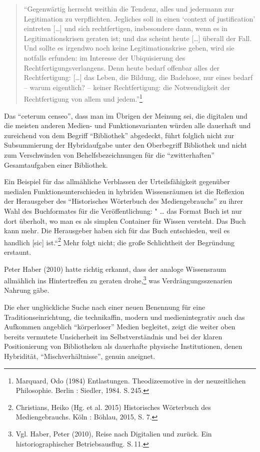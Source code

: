 \documentclass[a4paper,
fontsize=11pt,
oneside,
numbers=noperiodatend,
parskip=half-,
bibliography=totoc,
final
]{scrartcl}
\begin{document}
\begin{quote}
\enquote{Gegenwärtig herrscht weithin die Tendenz, alles und jedermann
zur Legitimation zu verpflichten. Jegliches soll in einen
\enquote{context of justification} eintreten {[}\ldots{}{]} und sich
rechtfertigen, insbesondere dann, wenn es in Legitimationskrisen geraten
ist; und das scheint heute {[}\ldots{}{]} überall der Fall. Und sollte
es irgendwo noch keine Legitimationskrise geben, wird sie notfalls
erfunden: im Interesse der Ubiquisierung des Rechtfertigungsverlangens.
Denn heute bedarf offenbar alles der Rechtfertigung: {[}\ldots{}{]} das
Leben, die Bildung, die Badehose, nur eines bedarf -- warum eigentlich?
-- keiner Rechtfertigung: die Notwendigkeit der Rechtfertigung von allem
und jedem.}\footnote{Marquard, Odo (1984) Entlastungen. Theodizeemotive
  in der neuzeitlichen Philosophie. Berlin : Siedler, 1984. S.\,245.}
\end{quote}

Das \enquote{ceterum censeo}, dass man im Übrigen der Meinung sei, die
digitalen und die meisten anderen Medien- und Funktionsvarianten würden
alle dauerhaft und zureichend von dem Begriff \enquote{Bibliothek}
abgedeckt, führt folglich nicht zur Subsummierung der Hybridaufgabe
unter den Oberbegriff Bibliothek und nicht zum Verschwinden von
Behelfsbezeichnungen für die \enquote{zwitterhaften} Gesamtaufgaben
einer Bibliothek.

Ein Beispiel für das allmähliche Verblassen der Urteilsfähigkeit
gegenüber medialen Funktionsunterschieden in hybriden Wissensräumen ist
die Reflexion der Herausgeber des \enquote{Historisches Wörterbuch des
Mediengebrauchs} zu ihrer Wahl des Buchformates für die
Veröffentlichung: " \ldots{} das Format Buch ist nur dort überholt, wo
man es als simplen Container für Wissen versteht. Das Buch kann mehr.
Die Herausgeber haben sich für das Buch entschieden, weil es handlich
{[}sic{]} ist.``\footnote{Christians, Heiko (Hg. et al. 2015)
  Historisches Wörterbuch des Mediengebrauchs. Köln : Böhlau, 2015, S.
  7.} Mehr folgt nicht; die große Schlichtheit der Begründung erstaunt.

Peter Haber (2010) hatte richtig erkannt, dass der analoge Wissensraum
allmählich ins Hintertreffen zu geraten drohe,\footnote{Vgl. Haber,
  Peter (2010), Reise nach Digitalien und zurück. Ein
  historiographischer Betriebsausflug. S.\,11.} was Verdrängungsszenarien
Nahrung gäbe.

Die eher unglückliche Suche nach einer neuen Benennung für eine
Traditionseinrichtung, die technikaffin, modern und medienintegrativ
auch das Aufkommen angeblich \enquote{körperloser} Medien begleitet,
zeigt die weiter oben bereits vermutete Unsicherheit im
Selbstverständnis und bei der klaren Positionierung von Bibliotheken als
dauerhafte physische Institutionen, denen Hybridität,
\enquote{Mischverhältnisse}, genuin aneignet.
\end{document}
